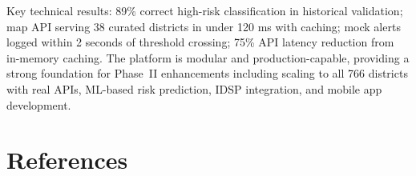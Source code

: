 \documentclass[12pt,a4paper]{report}
\begin{document}
Key technical results: 89\% correct high-risk classification in historical validation; map API serving 38 curated districts in under 120 ms with caching; mock alerts logged within 2 seconds of threshold crossing; 75\% API latency reduction from in-memory caching. The platform is modular and production-capable, providing a strong foundation for Phase~II enhancements including scaling to all 766 districts with real APIs, ML-based risk prediction, IDSP integration, and mobile app development.

\chapter*{References}
\end{document}
